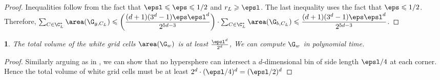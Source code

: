 \documentclass[10pt,a4paper]{article}
\theoremstyle{plain}
\theoremstyle{plain}
\newtheorem{lem}[theorem]{\protect\lemmaname}
\theoremstyle{plain}
\theoremstyle{definition}
\providecommand{\lemmaname}{Lemma}
\begin{document}
{\begin{proof}
		Inequalities follow from the fact that $\epsl \leqslant \eps \leqslant 1/2$ and $r_L \geqslant \epsl$.  The last inequality uses the fact that $\eps \leqslant 1/2$.
		Therefore, $\sum_{C \in \C_{L}^{*}} {\area(\G_{g, C_L})} \leqslant \bigg(\dfrac{(d+1)(3^d-1)\eps\epsl^d}{2^{5d-3}}\bigg) \cdot \sum_{C \in \C_{L}^{*}}  {\area(\G_{b, C_L})} \leqslant \dfrac{(d+1)(3^d-1)\eps\epsl^d}{2^{5d-3}}$.
	\end{proof}
	\begin{lem}\label{lem:white-circles-d}
		The total volume of the white grid cells \(\area(\G_w)\) is at least \(\frac{\epsl^d}{2^d}\), We can compute \(\G_w\) in polynomial time.
	\end{lem}
	\begin{proof}
		Similarly arguing as in , we can show that no hypersphere can intersect a $d$-dimensional bin of side length \(\epsl/4\) at each corner. Hence the total volume of white grid cells must be at least \(2^d\cdot(\epsl/4)^d=(\epsl/2)^d\)
	\end{proof}
	
}
\end{document}
